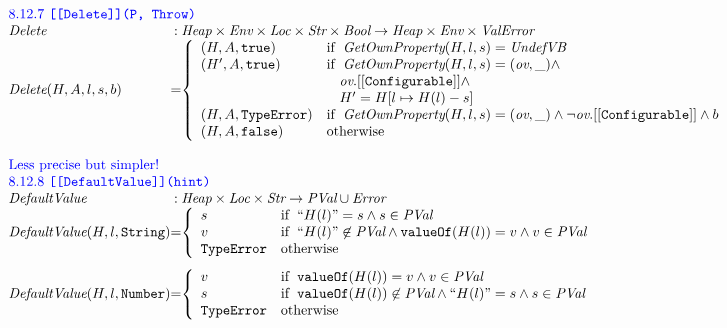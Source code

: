 \[\begin{array}{l@{}c@{}l}
\multicolumn{3}{l}{\mbox{\inblue 8.12.7 {\tt [[Delete]](P, Throw)}}}\\
\hf{Delete}&:&\Heap \times \Env \times \Loc \times \Str \times \Bool \rightarrow
\Heap \times \Env \times \ValError\\
\hf{Delete}(H,A,l,s,b) &=&
\left\{\begin{array}{ll}
(H, A, \true) & \ifc{\hf{GetOwnProperty}(H, l, s) = \UndefVB}\\
(H', A, \true) & \ifc{\hf{GetOwnProperty}(H, l, s) = (\emph{ov}, \_) \wedge}\\
&\mbox{\phantom{if\ }}
\emph{ov}.{\tt[[Configurable]]} \wedge\\
&\mbox{\phantom{if\ }}H' = H[l\mapsto H(l)-s]\\
(H, A, \te)&\ifc{\hf{GetOwnProperty}(H, l, s) = (\emph{ov}, \_) \wedge
\neg\emph{ov}.{\tt[[Configurable]]} \wedge b}\\
(H, A, \false)& \mbox{otherwise}
\end{array}\right.
\\\\

\multicolumn{3}{l}{\mbox{\inblue Less precise but simpler!}}\\
\multicolumn{3}{l}{\mbox{\inblue 8.12.8 {\tt [[DefaultValue]](hint)}}}\\
\hf{DefaultValue} & :& \Heap \times \Loc \times \Str \rightarrow \pval \cup \Error \\
\hf{DefaultValue}(H,l,{\tt String}) &=&
\left\{\begin{array}{ll}
s   & \ifc{``H(l)" = s \wedge s \in\pval} \\%
v & \ifc{``H(l)" \not\in\pval \wedge {\tt valueOf}(H(l)) = v \wedge v\in\pval}\\%
\te & \mbox{otherwise}
\end{array}\right.
\\[2em]

\hf{DefaultValue}(H,l,{\tt Number}) &=&
\left\{\begin{array}{ll}
v & \ifc{{\tt valueOf}(H(l)) = v \wedge v\in\pval} \\%
s & \ifc{{\tt valueOf}(H(l)) \not\in \pval \wedge ``H(l)" = s \wedge s\in\pval}\\%
\te & \mbox{otherwise}
\end{array}\right.
\\[4em]


\end{array}\]
